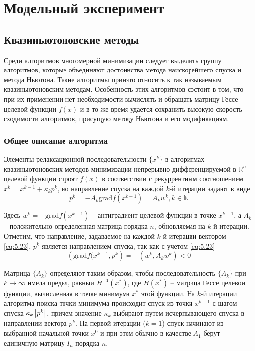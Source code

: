 \chapter{Модельный эксперимент}

\section{Квазиньютоновские методы}

Среди алгоритмов многомерной минимизации следует выделить группу алгоритмов, 
которые объединяют достоинства метода наискорейшего спуска и метода Ньютона. 
Такие алгоритмы принято относить к так называемым квазиньютоновским методам. 
Особенность этих алгоритмов состоит в том, что при их применении нет 
необходимости вычислять и обращать матрицу Гессе целевой функции \( f(x) \) 
и в то же время удается сохранить высокую скорость сходимости алгоритмов, 
присущую методу Ньютона и его модификациям.

\subsection{Общее описание алгоритма}

\newcommand{\grad}{\mathrm{grad}}

Элементы релаксационной последовательности \( \{ x^k \} \) в алгоритмах 
квазиньютоновских методов минимизации непрерывно дифференцируемой в 
\( \mathbb{R}^n \) целевой функции строят \( f(x) \) в соответствии с 
рекуррентным соотношением \( x^k = x^{k-1} + \kappa_k p^k \), но направление 
спуска на каждой \( k \)-й итерации задают в виде
\begin{equation}
    p^k = -A_k \grad f(x^{k-1}) = A_k w^k, k \in \mathbb{N}
    \label{eq:5.23}
\end{equation}

Здесь \( w^k = -\grad f(x^{k-1}) \) -- антиградиент целевой функции в точке 
\( x^{k-1} \), а \( A_k \) -- положительно определенная матрица порядка 
\( n \), обновляемая на \( k \)-й итерации. Отметим, что направление, 
задаваемое на каждой \( k \)-й итерации вектором \eqref{eq:5.23}, \( p^k \) 
является направлением спуска, так как с учетом \eqref{eq:5.23}
\begin{equation}
    \left( \grad f(x^{k-1}, p^k \right) = -\left( w^k, A_k w^k \right) < 0
\end{equation}

Матрица \( \{ A_k \} \) определяют таким образом, чтобы последовательность 
\( \{ A_k \} \) при \( k \rightarrow \infty \) имела предел, равный 
\( H^{-1}(x^*) \), где \( H(x^*) \) -- матрица Гессе целевой функции, 
вычисленная в точке минимума \( x^* \) этой функции. На \( k \)-й итерации 
алгоритма поиска точки минимума происходит спуск из точки \( x^{k-1} \) с 
шагом спуска \( \kappa_k \left| p^k \right| \), причем значение \( \kappa_k \) выбирают 
путем исчерпывающего спуска в направлении вектора \( p^k \). На первой 
итерации (\( k = 1 \)) спуск начинают из выбранной начальной точки \( x^0 \) и 
при этом обычно в качестве \( A_1 \) берут единичную матрицу \( I_n \) порядка 
\( n \). 

